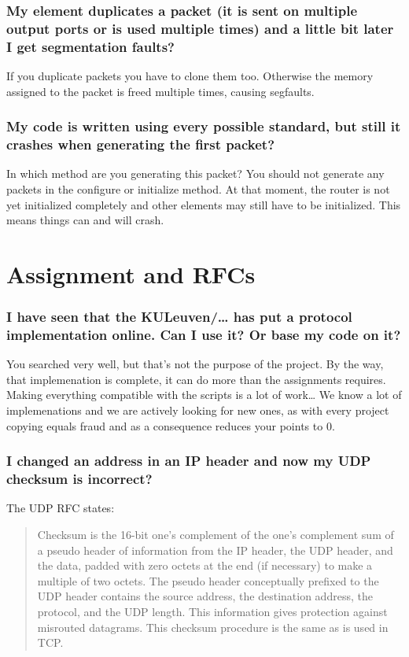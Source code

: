 \documentclass[a4paper]{article}
\begin{document}
\subsubsection*{My element duplicates a packet (it is sent on multiple output ports or
is used multiple times) and a little bit later I get segmentation
faults?}

If you duplicate packets you have to clone them too. Otherwise the
memory assigned to the packet is freed multiple times, causing
segfaults.

\subsubsection*{My code is written using every possible standard, but still it crashes
when generating the first packet?}

In which method are you generating this packet? You should not generate
any packets in the configure or initialize method. At that moment, the
router is not yet initialized completely and other elements may still
have to be initialized. This means things can and will crash.

\section{Assignment and RFCs}

\subsubsection*{I have seen that the KULeuven/\ldots{} has put a protocol implementation
online. Can I use it? Or base my code on it?}

You searched very well, but that's not the purpose of the project. By
the way, that implemenation is complete, it can do more than the
assignments requires. Making everything compatible with the scripts is a
lot of work\ldots{} We know a lot of implemenations and we are actively
looking for new ones, as with every project copying equals fraud and as
a consequence reduces your points to 0.

\subsubsection*{I changed an address in an IP header and now my UDP checksum is
incorrect?}

The UDP RFC states:

\begin{quote}
Checksum is the 16-bit one's complement of the one's complement sum of a
pseudo header of information from the IP header, the UDP header, and the
data, padded with zero octets at the end (if necessary) to make a
multiple of two octets. The pseudo header conceptually prefixed to the
UDP header contains the source address, the destination address, the
protocol, and the UDP length. This information gives protection against
misrouted datagrams. This checksum procedure is the same as is used in
TCP.
\end{quote}
\end{document}
